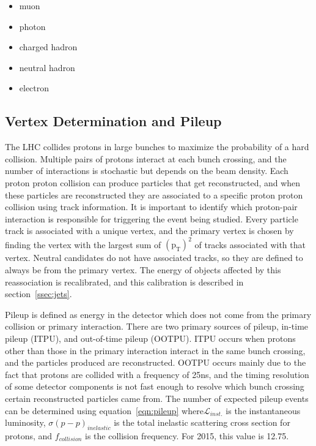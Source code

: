 \begin{itemize}
\item muon          
\item photon        
\item charged hadron
\item neutral hadron
\item electron      
\end{itemize}

\subsection{Vertex Determination and Pileup}
\label{ssec:vtxandpileup}
The LHC collides protons in large bunches to maximize the probability of a hard collision.
Multiple pairs of protons interact at each bunch crossing,
and the number of interactions is stochastic but depends on the beam density.
Each proton proton collision can produce particles that get reconstructed,
and when these particles are reconstructed they are associated to a specific proton proton collision using track information.
It is important to identify which proton-pair interaction is responsible for triggering the event being studied.
Every particle track is associated with a unique vertex,
and the primary vertex is chosen by finding the vertex with the largest sum of $\mathrm{(p_{T})^{2}}$ of tracks associated with that vertex.
Neutral candidates do not have associated tracks, so they are defined to always be from the primary vertex.
The energy of objects affected by this reassociation is recalibrated, and this calibration is described in section~\ref{ssec:jets}.

Pileup is defined as energy in the detector which does not come from the primary collision or primary interaction.
There are two primary sources of pileup, in-time pileup (ITPU), and out-of-time pileup (OOTPU).
ITPU occurs when protons other than those in the primary interaction interact in the same bunch crossing,
and the particles produced are reconstructed.
OOTPU occurs mainly due to the fact that protons are collided with a frequency of 25ns,
and the timing resolution of some detector components is not fast enough to resolve which bunch crossing certain reconstructed particles came from.
The number of expected pileup events can be determined using equation~\ref{eqn:pileup} where$\mathcal{L}_{inst.}$ is the instantaneous luminosity,
$\sigma(p-p)_{inelastic}$ is the total inelastic scattering cross section for protons,
and $f_{collision}$ is the collision frequency.
For 2015, this value is 12.75.

